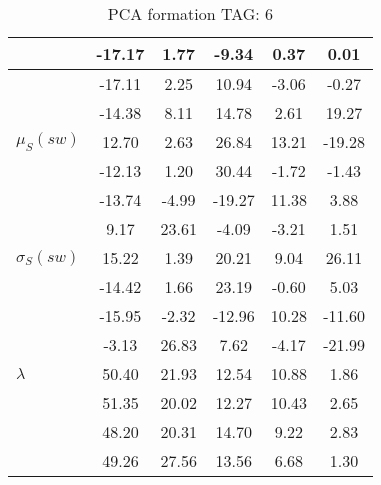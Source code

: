 \begin{table}[h!]
\begin{center}
\begin{tabular}{| l | c | c | c | c | c |}
 & -17.17  & 1.77  & -9.34  & 0.37  & 0.01 \\\hline
 & -17.11  & 2.25  & 10.94  & -3.06  & -0.27 \\\hline
 & -14.38  & 8.11  & 14.78  & 2.61  & 19.27 \\\hline
$\mu_S(sw)$ & 12.70  & 2.63  & 26.84  & 13.21  & -19.28 \\\hline
 & -12.13  & 1.20  & 30.44  & -1.72  & -1.43 \\\hline
 & -13.74  & -4.99  & -19.27  & 11.38  & 3.88 \\\hline
 & 9.17  & 23.61  & -4.09  & -3.21  & 1.51 \\\hline
$\sigma_S(sw)$ & 15.22  & 1.39  & 20.21  & 9.04  & 26.11 \\\hline
 & -14.42  & 1.66  & 23.19  & -0.60  & 5.03 \\\hline
 & -15.95  & -2.32  & -12.96  & 10.28  & -11.60 \\\hline
 & -3.13  & 26.83  & 7.62  & -4.17  & -21.99 \\\hline
$\lambda$ & 50.40  & 21.93  & 12.54  & 10.88  & 1.86 \\\hline
 & 51.35  & 20.02  & 12.27  & 10.43  & 2.65 \\\hline
 & 48.20  & 20.31  & 14.70  & 9.22  & 2.83 \\\hline
 & 49.26  & 27.56  & 13.56  & 6.68  & 1.30 \\\hline
\end{tabular}
\caption{PCA formation TAG: 6}
\end{center}
\end{table}